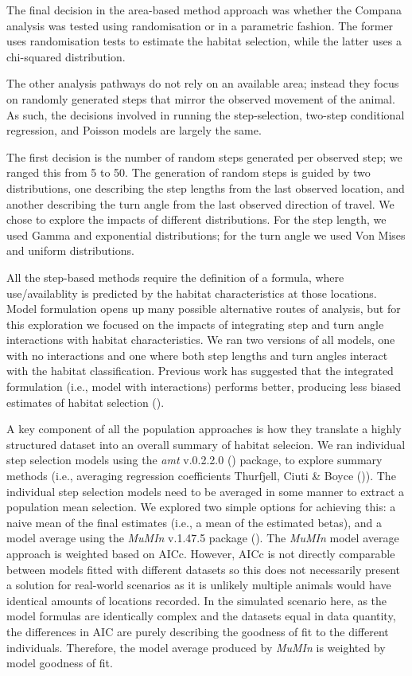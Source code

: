 \documentclass[10pt,a4paper]{article}
\begin{document}
The final decision in the area-based method approach was whether the Compana analysis was tested using randomisation or in a parametric fashion.
The former uses randomisation tests to estimate the habitat selection, while the latter uses a chi-squared distribution.

The other analysis pathways do not rely on an available area; instead they focus on randomly generated steps that mirror the observed movement of the animal.
As such, the decisions involved in running the step-selection, two-step conditional regression, and Poisson models are largely the same.

The first decision is the number of random steps generated per observed step; we ranged this from 5 to 50.
The generation of random steps is guided by two distributions, one describing the step lengths from the last observed location, and another describing the turn angle from the last observed direction of travel.
We chose to explore the impacts of different distributions.
For the step length, we used Gamma and exponential distributions; for the turn angle we used Von Mises and uniform distributions.

All the step-based methods require the definition of a formula, where use/availablity is predicted by the habitat characteristics at those locations.
Model formulation opens up many possible alternative routes of analysis, but for this exploration we focused on the impacts of integrating step and turn angle interactions with habitat characteristics.
We ran two versions of all models, one with no interactions and one where both step lengths and turn angles interact with the habitat classification.
Previous work has suggested that the integrated formulation (i.e., model with interactions) performs better, producing less biased estimates of habitat selection ().

A key component of all the population approaches is how they translate a highly structured dataset into an overall summary of habitat selecion.
We ran individual step selection models using the \emph{amt} v.0.2.2.0 () package, to explore summary methods (i.e., averaging regression coefficients Thurfjell, Ciuti \& Boyce ()).
The individual step selection models need to be averaged in some manner to extract a population mean selection.
We explored two simple options for achieving this: a naive mean of the final estimates (i.e., a mean of the estimated betas), and a model average using the \emph{MuMIn} v.1.47.5 package ().
The \emph{MuMIn} model average approach is weighted based on AICc.
However, AICc is not directly comparable between models fitted with different datasets so this does not necessarily present a solution for real-world scenarios as it is unlikely multiple animals would have identical amounts of locations recorded.
In the simulated scenario here, as the model formulas are identically complex and the datasets equal in data quantity, the differences in AIC are purely describing the goodness of fit to the different individuals.
Therefore, the model average produced by \emph{MuMIn} is weighted by model goodness of fit.
\end{document}
